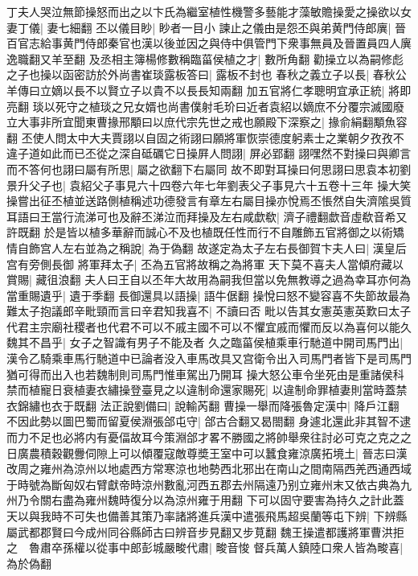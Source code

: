 丁夫人哭泣無節操怒而出之以卞氏為繼室植性機警多藝能才藻敏贍操愛之操欲以女妻丁儀|{
	妻七細翻}
丕以儀目眇|{
	眇者一目小}
諫止之儀由是怨丕與弟黄門侍郎廙|{
	晉百官志給事黄門侍郎秦官也漢以後並因之與侍中俱管門下衆事無員及晉置員四人廙逸職翻又羊至翻}
及丞相主簿楊修數稱臨菑侯植之才|{
	數所角翻}
勸操立以為嗣修彪之子也操以函密訪於外尚書崔琰露板答曰|{
	露板不封也}
春秋之義立子以長|{
	春秋公羊傳曰立嫡以長不以賢立子以貴不以長長知兩翻}
加五官將仁孝聰明宜承正統|{
	將即亮翻}
琰以死守之植琰之兄女婿也尚書僕射毛玠曰近者袁紹以嫡庶不分覆宗滅國廢立大事非所宜聞東曹掾邢顒曰以庶代宗先世之戒也願殿下深察之|{
	掾俞絹翻顒魚容翻}
丕使人問太中大夫賈詡以自固之術詡曰願將軍恢崇德度躬素士之業朝夕孜孜不違子道如此而已丕從之深自砥礪它日操屛人問詡|{
	屏必郢翻}
詡嘿然不對操曰與卿言而不答何也詡曰屬有所思|{
	屬之欲翻下右屬同}
故不即對耳操曰何思詡曰思袁本初劉景升父子也|{
	袁紹父子事見六十四卷六年七年劉表父子事見六十五卷十三年}
操大笑操嘗出征丕植並送路側植稱述功德發言有章左右屬目操亦悅焉丕悵然自失濟隂吳質耳語曰王當行流涕可也及辭丕涕泣而拜操及左右咸歔欷|{
	濟子禮翻歔音虛欷音希又許既翻}
於是皆以植多華辭而誠心不及也植既任性而行不自雕飾五官將御之以術矯情自飾宫人左右並為之稱說|{
	為于偽翻}
故遂定為太子左右長御賀卞夫人曰|{
	漢皇后宫有旁側長御}
將軍拜太子|{
	丕為五官將故稱之為將軍}
天下莫不喜夫人當傾府藏以賞賜|{
	藏徂浪翻}
夫人曰王自以丕年大故用為嗣我但當以免無教導之過為幸耳亦何為當重賜遺乎|{
	遺于季翻}
長御還具以語操|{
	語牛倨翻}
操悅曰怒不變容喜不失節故最為難太子抱議郎辛毗頸而言曰辛君知我喜不|{
	不讀曰否}
毗以告其女憲英憲英歎曰太子代君主宗廟社稷者也代君不可以不戚主國不可以不懼宜戚而懼而反以為喜何以能久魏其不昌乎|{
	女子之智識有男子不能及者}
久之臨菑侯植乘車行馳道中開司馬門出|{
	漢令乙騎乘車馬行馳道中已論者没入車馬改具又宫衛令出入司馬門者皆下是司馬門猶可得而出入也若魏制則司馬門惟車駕出乃開耳}
操大怒公車令坐死由是重諸侯科禁而植寵日衰植妻衣繡操登臺見之以違制命還家賜死|{
	以違制命罪植妻則當時蓋禁衣錦繡也衣于既翻}
法正說劉備曰|{
	說輸芮翻}
曹操一舉而降張魯定漢中|{
	降戶江翻}
不因此勢以圖巴蜀而留夏侯淵張郃屯守|{
	郃古合翻又曷閤翻}
身遽北還此非其智不逮而力不足也必將内有憂偪故耳今策淵郃才畧不勝國之將帥舉衆往討必可克之克之之日廣農積穀觀釁伺隙上可以傾覆寇敵尊奬王室中可以蠶食雍涼廣拓境土|{
	晉志曰漢改周之雍州為涼州以地處西方常寒涼也地勢西北邪出在南山之間南隔西羌西通西域于時號為斷匈奴右臂獻帝時涼州數亂河西五郡去州隔遠乃别立雍州末又依古典為九州乃令關右盡為雍州魏時復分以為涼州雍于用翻}
下可以固守要害為持久之計此蓋天以與我時不可失也備善其策乃率諸將進兵漢中遣張飛馬超吳蘭等屯下辨|{
	下辨縣屬武都郡賢曰今成州同谷縣師古曰辨音步見翻又步莧翻}
魏王操遣都護將軍曹洪拒之　魯肅卒孫權以從事中郎彭城嚴畯代肅|{
	畯音悛}
督兵萬人鎮陸口衆人皆為畯喜|{
	為於偽翻}
